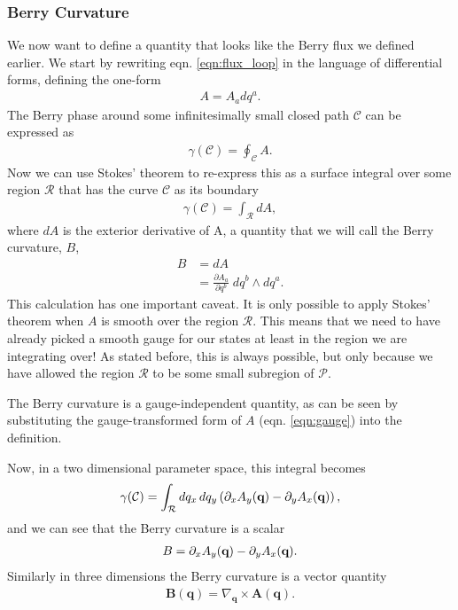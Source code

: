 \subsubsection{Berry Curvature}
We now want to define a quantity that looks like the Berry flux we defined earlier. We start by rewriting eqn. \ref{eqn:flux_loop} in the language of differential forms, defining the one-form
\begin{align}
	A = A_a d q^a.
\end{align}
The Berry phase around some infinitesimally small closed path $ \mathcal C$ can be expressed as
\begin{align} 
    \gamma(\mathcal C) = \oint_{\mathcal C} A.
\end{align}
Now we can use Stokes' theorem to re-express this as a surface integral over some region $\mathcal{R}$ that has the curve $\mathcal C$ as its boundary
\begin{align}
	\gamma(\mathcal C) = \int_{\mathcal{R}} dA,
\end{align}
where $dA$ is the exterior derivative of A, a quantity that we will call the Berry curvature, $B$,
\begin{align}
	B &= dA\\
	 &= \frac{\partial A_a}{\partial q^b} \; dq^b \wedge dq^a.
\end{align}
This calculation has one important caveat. It is only possible to apply Stokes' theorem when $A$ is smooth over the region $\mathcal{R}$. This means that we need to have already picked a smooth gauge for our states at least in the region we are integrating over! As stated before, this is always possible, but only because we have allowed the region $\mathcal R$ to be some small subregion of $\mathcal P$.\par
The Berry curvature is a gauge-independent quantity, as can be seen by substituting the gauge-transformed form of $A$ (eqn. \ref{eqn:gauge}) into the definition. \par
Now, in a two dimensional parameter space, this integral becomes
\begin{align}
	\gamma(\mathcal C) = \int_{\mathcal{R}} d q_x\, d q_y \left (  \partial_{x} A_{y}(\bf q) - \partial_{y} A_{x}(\bf q) \right ),
\end{align}
and we can see that the Berry curvature is a scalar
\begin{align}
	B = \partial_{x} A_{y}(\bf q) - \partial_{y} A_{x}(\bf q).
\end{align}
Similarly in three dimensions the Berry curvature is a vector quantity
\begin{align} \label{eqn:3d_curvature}
    \textbf{B}(\textbf{q}) = \nabla_\textbf{q} \times \textbf{A}(\textbf{q}).
\end{align}

